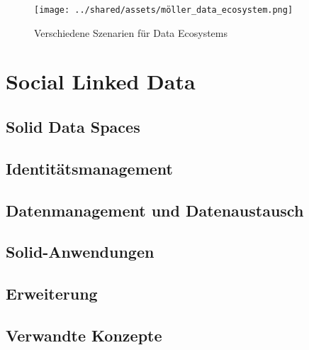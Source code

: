 \begin{figure}
    \texttt{[image: ../shared/assets/möller\_data\_ecosystem.png]}
    \caption{Verschiedene Szenarien für Data Ecosystems~\cite{mollerIndustrialDataEcosystems2024}}
\end{figure}


\clearpage
\section{Social Linked Data}

\subsection{Solid Data Spaces}

\subsection{Identitätsmanagement}

\subsection{Datenmanagement und Datenaustausch}

\subsection{Solid-Anwendungen}

\subsection{Erweiterung}

\subsection{Verwandte Konzepte}
